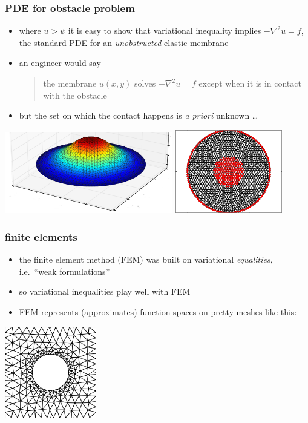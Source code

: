\documentclass{beamer}
\newcommand{\grad}{\nabla}
\begin{document}
\begin{frame}
  \frametitle{PDE for obstacle problem}

\small
\begin{itemize}
\item where $u>\psi$ it is easy to show that variational inequality implies $-\grad^2 u = f$, the standard PDE for an \emph{unobstructed} elastic membrane
\item an engineer would say
\begin{quote}
the membrane $u(x,y)$ solves $-\grad^2 u = f$ except when it is in contact with the obstacle
\end{quote}
\item but the set on which the contact happens is \emph{a priori} unknown \dots
\end{itemize}
\normalsize

\begin{center}
\includegraphics[width=0.55\textwidth]{figs/obs-soln} \quad \includegraphics[width=0.35\textwidth]{figs/obs-coincidence} 
\end{center}
\end{frame}


\begin{frame}
  \frametitle{finite elements}

\begin{itemize}
\item the finite element method (FEM) was built on variational \emph{equalities}, i.e.~``weak formulations''
\item so variational inequalities play well with FEM
\item FEM represents (approximates) function spaces on pretty meshes like this:
\end{itemize}

\begin{center}
\includegraphics[width=0.3\textwidth]{figs/constantineexample3}
\end{center}
\end{frame}
\end{document}
